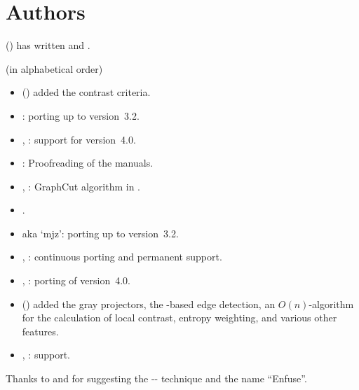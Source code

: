 

\chapter[Authors\commonpart]{Authors\commonpart
  \label{sec:authors}
  }

 () has
written  and .

\bigskip
\noindent
{} (in alphabetical order)

\begin{itemize}
\item
   ()
  added the contrast criteria.

\item
  :  porting up to version~3.2.

\item
  , :
   support for version~4.0.

\item
  : Proofreading of the manuals.

\item
  ,
  : GraphCut algorithm in
  .

\item
  .

\item
   aka `mjz':  porting up to
  version~3.2.

\item
  , :
  continuous  porting and permanent
   support.

\item
  , :
   porting of version~4.0.

\item
   ()
  added the gray projectors, the -based edge detection,
  an $O(n)$-algorithm for the calculation of local contrast, entropy
  weighting, and various other features.

\item
  , :
   support.
\end{itemize}

Thanks to  and 
for suggesting the
--
technique and the name ``Enfuse''.
